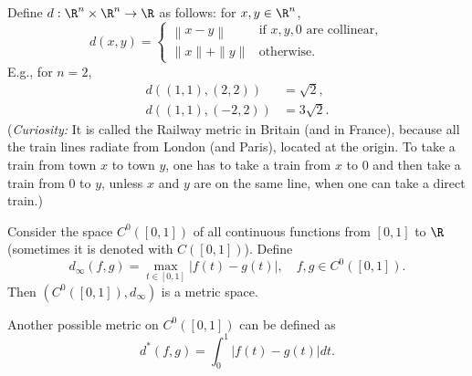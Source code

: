 \begin{example}\label{railway}
Define $d : \R^n \times \R^n \to \R$ as follows: for $x,y \in \R^n$,
\[
d(x,y) = \begin{cases} \left\|x - y\right\| & \text{if $x,y,0$ are collinear}, \\ \|x\| + \|y\| & \text{otherwise}. \end{cases}
\]
E.g., for $n = 2$,
\begin{align*}
d((1,1),(2,2)) & = \sqrt{2}, \\
d((1,1),(-2,2)) & = 3\sqrt{2}.
\end{align*}%
(\textit{Curiosity:} It is called the Railway metric in Britain (and in France), because all the train lines radiate from London (and Paris), located at the origin. To take a train from town $x$ to town $y$, one has to take a train from $x$ to $0$ and then take a train from $0$ to $y$, unless $x$ and $y$ are on the same line, when one can take a direct train.)

\medskip


%
%
\end{example}



\begin{example}\label{continuous_functions}
Consider the space $C^0([0,1])$ of all continuous functions from $[0,1]$ to $\R$ (sometimes it is denoted with $C([0,1])$).
Define
\[
d_\infty(f,g) = \max_{t \in [0,1]} \left|f(t) - g(t)\right|, \quad f,g \in C^0([0,1]).
\]%
Then $(C^0([0,1]),d_\infty)$ is a metric space. 

\quad 

Another possible metric on $C^0([0,1])$ can be defined as 
$$
d^\ast(f,g) = \int_0^1|f(t)-g(t)|dt.
$$

\end{example}


